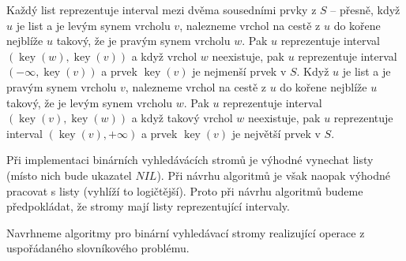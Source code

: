 \documentclass[a4paper,12pt]{article}
\DeclareMathOperator*{\key}{key}
\begin{document}
Každý list reprezentuje interval mezi dvěma 
sousedními prvky z $S$ -- přesně, když $u$ je list a je 
levým synem vrcholu $v$, nalezneme vrchol na cestě z $u$ 
do kořene nejblíže $u$ takový, že je pravým synem 
vrcholu $w$. Pak $u$ repre\-zentuje interval $(\key(w),\key(v))$ a 
když vrchol $w$ neexistuje, pak $u$ repre\-zentuje 
interval $(-\infty ,\key(v))$ a prvek $\key(v)$ je nej\-menší prvek v 
$S$.  Když $u$ je list a je pravým synem vrcholu $v$, 
nalezneme vrchol na cestě z $u$ do kořene nejblíže 
$u$ takový, že je levým synem vrcholu $w$. Pak $u$ repre\-zentuje 
interval $(\key(v),\key(w))$ a když takový vrchol $w$ neexistuje, 
pak $u$ repre\-zentuje interval $(\key(v),+\infty )$ a prvek $\key
(v)$ 
je největší prvek v $S$.  

Při implementaci binárních vyhledávácích 
stromů je výhodné vynechat listy (místo nich bude 
ukazatel $NIL$). Při návrhu algoritmů je však 
naopak výhodné 
pracovat s listy (vyhlíží to logičtější). Proto při návrhu 
algoritmů budeme předpokládat, že stromy mají 
listy reprezentující intervaly.

Navrhneme algoritmy pro binární vyhledávací stromy 
rea\-lizují\-cí operace z uspořádaného slovníkového problému.
\end{document}
